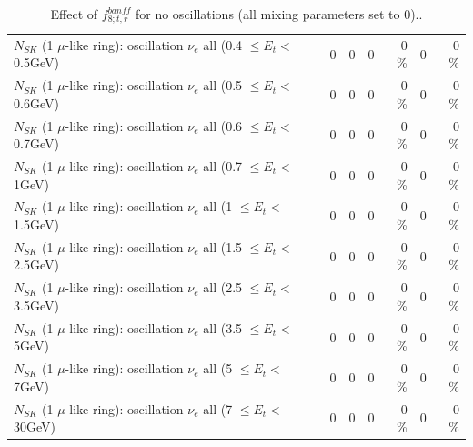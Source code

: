 \begin{table}
\begin{tabular}{| l | r | r | r  r | r  r |}
$N_{SK}$ (1 $\mu$-like ring): oscillation $\nu_{e}$ all (0.4 $\leq E_{t} <$ 0.5GeV) &               0 &               0 &               0 &        0 \%  &               0 &        0 \%  \\ 
$N_{SK}$ (1 $\mu$-like ring): oscillation $\nu_{e}$ all (0.5 $\leq E_{t} <$ 0.6GeV) &               0 &               0 &               0 &        0 \%  &               0 &        0 \%  \\ 
$N_{SK}$ (1 $\mu$-like ring): oscillation $\nu_{e}$ all (0.6 $\leq E_{t} <$ 0.7GeV) &               0 &               0 &               0 &        0 \%  &               0 &        0 \%  \\ 
$N_{SK}$ (1 $\mu$-like ring): oscillation $\nu_{e}$ all (0.7 $\leq E_{t} <$ 1GeV) &               0 &               0 &               0 &        0 \%  &               0 &        0 \%  \\ 
$N_{SK}$ (1 $\mu$-like ring): oscillation $\nu_{e}$ all (1 $\leq E_{t} <$ 1.5GeV) &               0 &               0 &               0 &        0 \%  &               0 &        0 \%  \\ 
$N_{SK}$ (1 $\mu$-like ring): oscillation $\nu_{e}$ all (1.5 $\leq E_{t} <$ 2.5GeV) &               0 &               0 &               0 &        0 \%  &               0 &        0 \%  \\ 
$N_{SK}$ (1 $\mu$-like ring): oscillation $\nu_{e}$ all (2.5 $\leq E_{t} <$ 3.5GeV) &               0 &               0 &               0 &        0 \%  &               0 &        0 \%  \\ 
$N_{SK}$ (1 $\mu$-like ring): oscillation $\nu_{e}$ all (3.5 $\leq E_{t} <$ 5GeV) &               0 &               0 &               0 &        0 \%  &               0 &        0 \%  \\ 
 $N_{SK}$ (1 $\mu$-like ring): oscillation $\nu_{e}$ all (5 $\leq E_{t} <$ 7GeV) &               0 &               0 &               0 &        0 \%  &               0 &        0 \%  \\ 
$N_{SK}$ (1 $\mu$-like ring): oscillation $\nu_{e}$ all (7 $\leq E_{t} <$ 30GeV) &               0 &               0 &               0 &        0 \%  &               0 &        0 \%  \\ 
\hline
\hline
\end{tabular}
\caption{ Effect of $f_{8; t, r}^{banff}$ for no oscillations (all mixing parameters set to 0).. }
\label{tab:num_banff_08_1RmuT_3f_osc_t13:0}
\end{table}
\clearpage
